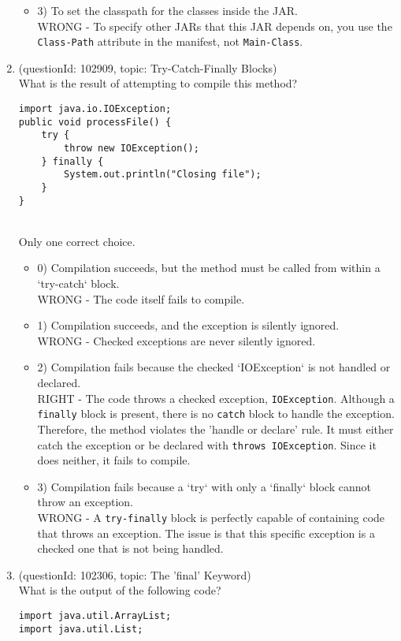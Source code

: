 \documentclass[12pt]{article}
\begin{document}
\begin{enumerate}[label=(\arabic*)]
\begin{itemize}
\item 3) To set the classpath for the classes inside the JAR.
 \\ 
WRONG - To specify other JARs that this JAR depends on, you use the \verb|Class-Path| attribute in the manifest, not \verb|Main-Class|.

\end{itemize}
\item (questionId: 102909, topic: Try-Catch-Finally Blocks) \\ 
What is the result of attempting to compile this method?
\begin{verbatim}
import java.io.IOException;
public void processFile() {
    try {
        throw new IOException();
    } finally {
        System.out.println("Closing file");
    }
}
\end{verbatim}
\\ \noindent Only one correct choice. 
\begin{itemize}
\item 0) Compilation succeeds, but the method must be called from within a `try-catch` block.
 \\ 
WRONG - The code itself fails to compile.

\item 1) Compilation succeeds, and the exception is silently ignored.
 \\ 
WRONG - Checked exceptions are never silently ignored.

\item 2) Compilation fails because the checked `IOException` is not handled or declared.
 \\ 
RIGHT - The code throws a checked exception, \verb|IOException|. Although a \verb|finally| block is present, there is no \verb|catch| block to handle the exception. Therefore, the method violates the 'handle or declare' rule. It must either catch the exception or be declared with \verb|throws IOException|. Since it does neither, it fails to compile.

\item 3) Compilation fails because a `try` with only a `finally` block cannot throw an exception.
 \\ 
WRONG - A \verb|try-finally| block is perfectly capable of containing code that throws an exception. The issue is that this specific exception is a checked one that is not being handled.

\end{itemize}
\item (questionId: 102306, topic: The 'final' Keyword) \\ 
What is the output of the following code?\n\begin{verbatim}
import java.util.ArrayList;
import java.util.List;


\end{verbatim}
\end{enumerate}
\end{document}
